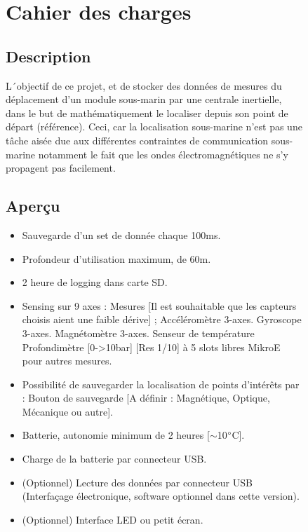 \begin{figure}

\hfill


\begin{minipage}{1\textwidth}
\section{Cahier des charges}

\subsection{Description}
L\'\ objectif de ce projet, et de stocker des données de mesures du déplacement d’un module sous-marin par une centrale inertielle, dans le but de mathématiquement le localiser depuis son point de départ (référence). Ceci, car la localisation sous-marine n’est pas une tâche aisée due aux différentes contraintes de communication sous-marine notamment le fait que les ondes électromagnétiques ne s’y propagent pas facilement.
\end{minipage} \vspace{+4mm}

\begin{minipage}{1\textwidth}

\subsection{Aperçu}
    \begin{itemize}
        \item	Sauvegarde d’un set de donnée chaque 100ms.
        \item	Profondeur d’utilisation maximum, de 60m.
        \item	2 heure de logging dans carte SD.
        \item	Sensing sur 9 axes :
        \subitem Mesures [Il est souhaitable que les capteurs choisis aient une faible dérive] ;
        \subsubitem Accéléromètre 3-axes. 
        \subsubitem	Gyroscope 3-axes.
        \subsubitem	Magnétomètre 3-axes. 
        \subsubitem	Senseur de température
        \subsubitem	Profondimètre [0->10bar] [Res 1/10]
         à 5 slots libres MikroE pour autres mesures. 
        \item Possibilité de sauvegarder la localisation de points d’intérêts par :
        \subitem Bouton de sauvegarde [A définir : Magnétique, Optique, Mécanique ou autre].
        \item Batterie, autonomie minimum de 2 heures [$\sim$10$\degree$C].
        \item Charge de la batterie par connecteur USB.
        \item (Optionnel) Lecture des données par connecteur USB (Interfaçage électronique, software optionnel dans cette version).
        \item (Optionnel) Interface LED ou petit écran.\\
    \end{itemize}


\end{minipage}

\end{figure}


